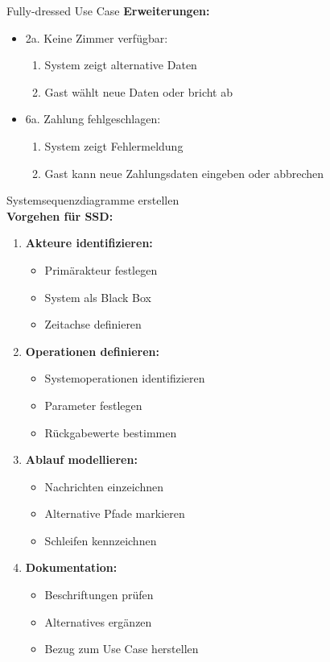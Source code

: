 \begin{example2}{Fully-dressed Use Case}
\textbf{Erweiterungen:}
\begin{itemize}
    \item 2a. Keine Zimmer verfügbar:
    \begin{enumerate}
        \item System zeigt alternative Daten
        \item Gast wählt neue Daten oder bricht ab
    \end{enumerate}
    \item 6a. Zahlung fehlgeschlagen:
    \begin{enumerate}
        \item System zeigt Fehlermeldung
        \item Gast kann neue Zahlungsdaten eingeben oder abbrechen
    \end{enumerate}
\end{itemize}
\end{example2}

\begin{KR}{Systemsequenzdiagramme erstellen}\\
\textbf{Vorgehen für SSD:}
\begin{enumerate}
    \item \textbf{Akteure identifizieren:}
    \begin{itemize}
        \item Primärakteur festlegen
        \item System als Black Box
        \item Zeitachse definieren
    \end{itemize}
    
    \item \textbf{Operationen definieren:}
    \begin{itemize}
        \item Systemoperationen identifizieren
        \item Parameter festlegen
        \item Rückgabewerte bestimmen
    \end{itemize}
    
    \item \textbf{Ablauf modellieren:}
    \begin{itemize}
        \item Nachrichten einzeichnen
        \item Alternative Pfade markieren
        \item Schleifen kennzeichnen
    \end{itemize}
    
    \item \textbf{Dokumentation:}
    \begin{itemize}
        \item Beschriftungen prüfen
        \item Alternatives ergänzen
        \item Bezug zum Use Case herstellen
    \end{itemize}
\end{enumerate}
\end{KR}

